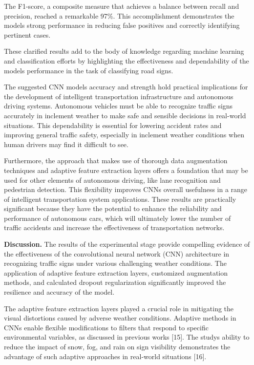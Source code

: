 The F1-score, a composite measure that achieves a balance between recall
and precision, reached a remarkable 97\%. This accomplishment
demonstrates the model\textquotesingle s strong performance in reducing
false positives and correctly identifying pertinent cases.

These clarified results add to the body of knowledge regarding machine
learning and classification efforts by highlighting the effectiveness
and dependability of the model\textquotesingle s performance in the task
of classifying road signs.

The suggested CNN model\textquotesingle s accuracy and strength hold
practical implications for the development of intelligent transportation
infrastructure and autonomous driving systems. Autonomous vehicles must
be able to recognize traffic signs accurately in inclement weather to
make safe and sensible decisions in real-world situations. This
dependability is essential for lowering accident rates and improving
general traffic safety, especially in inclement weather conditions when
human drivers may find it difficult to see.

Furthermore, the approach that makes use of thorough data augmentation
techniques and adaptive feature extraction layers offers a foundation
that may be used for other elements of autonomous driving, like lane
recognition and pedestrian detection. This flexibility improves
CNNs\textquotesingle{} overall usefulness in a range of intelligent
transportation system applications. These results are practically
significant because they have the potential to enhance the reliability
and performance of autonomous cars, which will ultimately lower the
number of traffic accidents and increase the effectiveness of
transportation networks.

{\bfseries Discussion.} The results of the experimental stage provide
compelling evidence of the effectiveness of the convolutional neural
network (CNN) architecture in recognizing traffic signs under various
challenging weather conditions. The application of adaptive feature
extraction layers, customized augmentation methods, and calculated
dropout regularization significantly improved the resilience and
accuracy of the model.

The adaptive feature extraction layers played a crucial role in
mitigating the visual distortions caused by adverse weather conditions.
Adaptive methods in CNNs enable flexible modifications to filters that
respond to specific environmental variables, as discussed in previous
works {[}15{]}. The study\textquotesingle s ability to reduce the impact
of snow, fog, and rain on sign visibility demonstrates the advantage of
such adaptive approaches in real-world situations {[}16{]}.

